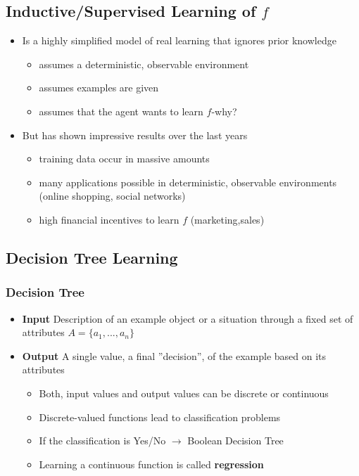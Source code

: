 \documentclass[conference, a4paper]{styles/acmsiggraph}
\begin{document}
    \subsection{Inductive/Supervised Learning of $f$}
        \begin{itemize}
            \item Is a highly simplified model of real learning that ignores prior knowledge
            \begin{itemize}
                \item assumes a deterministic, observable environment
                \item assumes examples are given
                \item assumes that the agent wants to learn $f$-why?
            \end{itemize}
            \item But has shown impressive results over the last years
            \begin{itemize}
                \item training data occur in massive amounts
                \item many applications possible in deterministic, observable environments (online shopping, social networks)
                \item high financial incentives to learn $f$ (marketing,sales)
            \end{itemize}
        \end{itemize}

\newpage

    \subsection{Decision Tree Learning}
        \subsubsection{Decision Tree}
            \begin{itemize}
                \item \textbf{Input}\newline
                Description of an example object or a situation through a fixed set of attributes $A = \{a_1,...,a_n\}$
                \item \textbf{Output}\newline
                A single value, a final ''decision'', of the example based on its attributes
                \begin{itemize}
                    \item Both, input values and output values can be discrete or continuous
                    \item Discrete-valued functions lead to classification problems
                    \item If the classification is Yes/No $\rightarrow$ Boolean Decision Tree
                    \item Learning a continuous function is called \textbf{regression}
                \end{itemize}
            \end{itemize}
    
\end{document}

